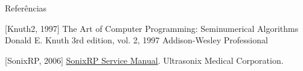 \documentclass[]{beamer}
\begin{document}



\begin{frame}{Referências}
\begin{thebibliography}{4}

[Knuth2, 1997]
The Art of Computer Programming: Seminumerical Algorithms
\newblock Donald E. Knuth
\newblock 3rd edition, vol. 2, 1997
\newblock Addison-Wesley Professional

[SonixRP, 2006]
  \href{http://www.ultrasonix.com/webfm_send/634}{SonixRP Service
    Manual}.
  \newblock Ultrasonix Medical Corporation.
\end{thebibliography}
\end{frame}
\end{document}
